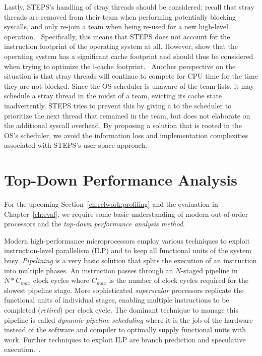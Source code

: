 \documentclass[12pt,a4paper]{book}
\begin{document}
Lastly, STEPS's handling of stray threads should be considered: recall that stray threads are removed from their team when performing potentially blocking syscalls, and only re-join a team when being re-used for a new high-level operation.~\cite{steps}
Specifically, this means that STEPS does not account for the instruction footprint of the operating system at all.
However, \citeauthor*{osCacheFootprint} show that the operating system has a significant cache footprint and should thus be considered when trying to optimize the i-cache footprint.~\cite{osCacheFootprint,compspr} %
Another perspective on the situation is that stray threads will continue to compete for CPU time for the time they are not blocked.
Since the OS scheduler is unaware of the team lists, it may schedule a stray thread in the midst of a team, evicting its cache state inadvertently.
STEPS tries to prevent this by giving a  to the scheduler to prioritize the next thread that remained in the team, but does not elaborate on the additional syscall overhead.
By proposing a solution that is rooted in the OS's scheduler, we avoid the information loss and implementation complexities associated with STEPS's user-space approach.

\section{Top-Down Performance Analysis}\label{ch:relwork:topdown}
For the upcoming Section~\ref{ch:relwork:profiling} and the evaluation in Chapter~\ref{ch:eval}, we require some basic understanding of modern out-of-order processors and the \emph{top-down performance analysis method}.

Modern high-performance microprocessors employ various techniques to exploit instruction-level parallelism (ILP) and to keep all functional units of the system busy.
\emph{Pipelining} is a very basic solution that splits the execution of an instruction into multiple phases. An instruction passes through an $N$-staged pipeline in $N * C_{max}$ clock cycles where $C_{max}$ is the number of clock cycles required for the slowest pipeline stage.
More sophisticated \emph{superscalar} processors replicate the functional units of individual stages, enabling multiple instructions to be completed (\emph{retired}) per clock cycle.
The dominant technique to manage this pipeline is called \emph{dynamic pipeline scheduling} where it is the job of the hardware instead of the software and compiler to optimally supply functional units with work.
Further techniques to exploit ILP are branch prediction and speculative execution.~\cite{hennessy2002DynamicPipeline}.
\end{document}
